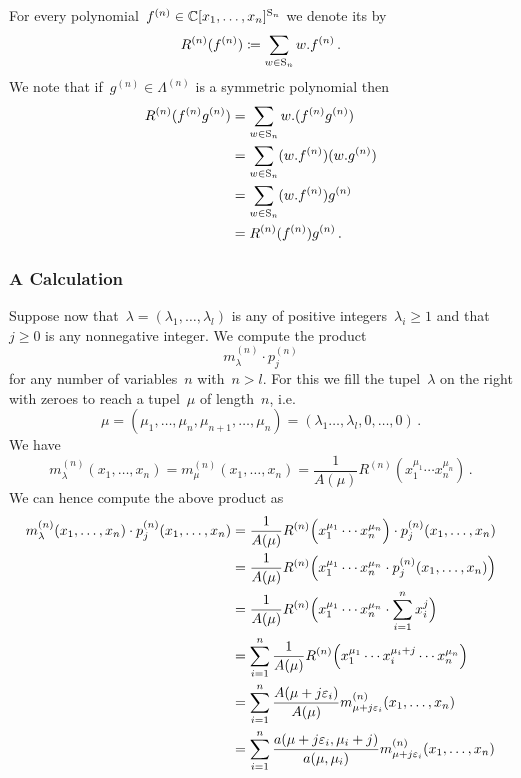 \documentclass[a4paper,11pt]{scrartcl}
\begin{document}
For every polynomial~$f^{(n)} \in \mathbb{C}[x_1, \dotsc, x_n]^{\mathrm{S}_n}$ we denote its  by
\[
  R^{(n)}( f^{(n)} )
  \coloneqq
  \sum_{w \in \mathrm{S}_n}
  w . f^{(n)} \,.
\]
We note that if~$g^{(n)} \in \Lambda^{(n)}$ is a symmetric polynomial then
\begin{align*}
  R^{(n)}( f^{(n)} g^{(n)} )
  &=
  \sum_{w \in \mathrm{S}_n}
  w . ( f^{(n)} g^{(n)} )
  \\
  &=
  \sum_{w \in \mathrm{S}_n}
  (w . f^{(n)}) (w . g^{(n)})
  \\
  &=
  \sum_{w \in \mathrm{S}_n}
  (w . f^{(n)}) g^{(n)}
  \\
  &=
  R^{(n)}( f^{(n)} ) g^{(n)} \,.
\end{align*}


\subsubsection{A Calculation}

Suppose now that~$\lambda = (\lambda_1, \dotsc, \lambda_l)$ is any of positive integers~$\lambda_i \geq 1$ and that~$j \geq 0$ is any nonnegative integer.
We compute the product
\[
  m^{(n)}_\lambda
  \cdot
  p^{(n)}_j
\]
for any number of variables~$n$ with~$n > l$.
For this we fill the tupel~$\lambda$ on the right with zeroes to reach a tupel~$\mu$ of length~$n$, i.e.
\[
  \mu
  =
  (\mu_1, \dotsc, \mu_n, \mu_{n+1}, \dotsc, \mu_n)
  =
  (\lambda_1 \dotsc, \lambda_l, 0, \dotsc, 0) \,.
\]
We have
\[
  m^{(n)}_\lambda(x_1, \dotsc, x_n)
  =
  m^{(n)}_\mu(x_1, \dotsc, x_n)
  =
  \frac{1}{A(\mu)}
  R^{(n)}( x_1^{\mu_1} \dotsm x_n^{\mu_n} ) \,.
\]
We can hence compute the above product as
\begin{align*}
  m^{(n)}_\lambda(x_1, \dotsc, x_n) \cdot p^{(n)}_j(x_1, \dotsc, x_n)
  &=
  \frac{1}{A(\mu)}
  R^{(n)}\Bigl( x_1^{\mu_1} \dotsm x_n^{\mu_n} \Bigr)
  \cdot
  p^{(n)}_j(x_1, \dotsc, x_n)
  \\
  &=
  \frac{1}{A(\mu)}
  R^{(n)}
  \Bigl(
    x_1^{\mu_1} \dotsm x_n^{\mu_n}
    \cdot
    p^{(n)}_j(x_1, \dotsc, x_n)
  \Bigr)
  \\
  &=
  \frac{1}{A(\mu)}
  R^{(n)}
  \Bigl(
    x_1^{\mu_1} \dotsm x_n^{\mu_n}
    \cdot
    \sum_{i=1}^n x_i^j
  \Bigr)
  \\
  &=
  \sum_{i=1}^n
  \frac{1}{A(\mu)}
  R^{(n)}
  \Bigl(
    x_1^{\mu_1} \dotsm x_i^{\mu_i + j} \dotsm x_n^{\mu_n}
  \Bigr)
  \\
  &=
  \sum_{i=1}^n
  \frac{ A(\mu + j \varepsilon_i) }{ A(\mu) }
  m^{(n)}_{\mu + j \varepsilon_i}(x_1, \dotsc, x_n)
  \\
  &=
  \sum_{i=1}^n
  \frac{ a(\mu + j \varepsilon_i, \mu_i + j) }{ a(\mu, \mu_i) } 
  m^{(n)}_{\mu + j \varepsilon_i}(x_1, \dotsc, x_n)
\end{align*}
\end{document}
